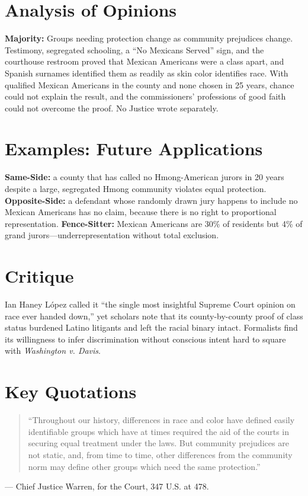 \documentclass[12pt]{article}
\begin{document}
\section{Analysis of Opinions}
\textbf{Majority:} Groups needing protection change as community prejudices change. Testimony, segregated schooling, a ``No Mexicans Served'' sign, and the courthouse restroom proved that Mexican Americans were a class apart, and Spanish surnames identified them as readily as skin color identifies race. With qualified Mexican Americans in the county and none chosen in 25 years, chance could not explain the result, and the commissioners' professions of good faith could not overcome the proof. No Justice wrote separately.

\section{Examples: Future Applications}
\textbf{Same-Side:} a county that has called no Hmong-American jurors in 20 years despite a large, segregated Hmong community violates equal protection. \textbf{Opposite-Side:} a defendant whose randomly drawn jury happens to include no Mexican Americans has no claim, because there is no right to proportional representation. \textbf{Fence-Sitter:} Mexican Americans are 30\% of residents but 4\% of grand jurors---underrepresentation without total exclusion.

\section{Critique}
Ian Haney L\'{o}pez called it ``the single most insightful Supreme Court opinion on race ever handed down,'' yet scholars note that its county-by-county proof of class status burdened Latino litigants and left the racial binary intact. Formalists find its willingness to infer discrimination without conscious intent hard to square with \textit{Washington v. Davis}.

\section{Key Quotations}
\begin{quote}
``Throughout our history, differences in race and color have defined easily identifiable groups which have at times required the aid of the courts in securing equal treatment under the laws. But community prejudices are not static, and, from time to time, other differences from the community norm may define other groups which need the same protection.''
\end{quote}
\noindent --- Chief Justice Warren, for the Court, 347 U.S. at 478.
\end{document}
